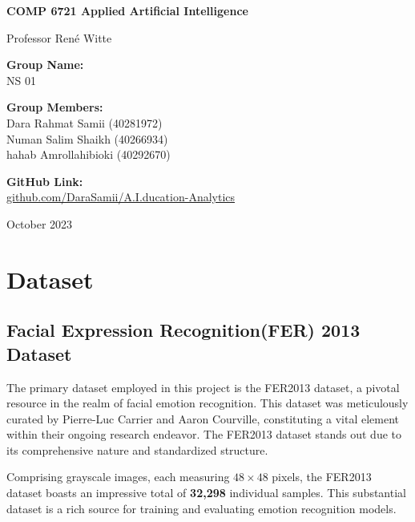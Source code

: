 \documentclass[]{report}
\begin{document}
\begin{titlepage}
	\begin{center}
		\vspace*{1cm}

		
		
		\vspace*{2cm}
		
		\textbf{\Large COMP 6721 Applied Artificial Intelligence}
		
		\vspace{0.5cm}
		Professor René Witte
		
		\vspace{1.5cm}
		\textbf{Group Name:}\\
		NS 01
		\vspace{1.5cm}
		
		\textbf{Group Members:}\\
		Dara Rahmat Samii (40281972)\\ Numan Salim Shaikh (40266934) \\ hahab Amrollahibioki (40292670)
		
		
		\vfill
		
		\textbf{GitHub Link:}\\
		\href{https://github.com/DaraSamii/A.I.ducation-Analytics}{github.com/DaraSamii/A.I.ducation-Analytics}
		
		\vfill

		
		October 2023
		
	\end{center}
\end{titlepage}
\newpage
\chapter{Dataset}
\section{Facial Expression Recognition(FER) 2013 Dataset}
The primary dataset employed in this project is the FER2013 dataset\cite{FER2013}, a pivotal resource in the realm of facial emotion recognition. This dataset was meticulously curated by Pierre-Luc Carrier and Aaron Courville, constituting a vital element within their ongoing research endeavor. The FER2013 dataset stands out due to its comprehensive nature and standardized structure.

Comprising grayscale images, each measuring $48 \times 48$ pixels, the FER2013 dataset boasts an impressive total of \textbf{32,298} individual samples. This substantial dataset is a rich source for training and evaluating emotion recognition models.
\end{document}
